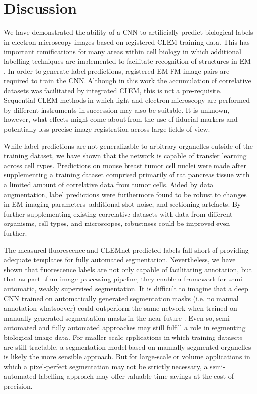 \section{Discussion}
\label{sec:4.3_discussion}

We have demonstrated the ability of a CNN to artificially predict biological labels in electron microscopy images based on registered CLEM training data. This has important ramifications for many areas within cell biology in which additional labelling techniques are implemented to facilitate recognition of structures in EM \cite{de2015correlated}. In order to generate label predictions, registered EM-FM image pairs are required to train the CNN. Although in this work the accumulation of correlative datasets was facilitated by integrated CLEM, this is not a pre-requisite. Sequential CLEM methods in which light and electron microscopy are performed by different instruments in succession may also be suitable. It is unknown, however, what effects might come about from the use of fiducial markers and potentially less precise image registration across large fields of view.

While label predictions are not generalizable to arbitrary organelles outside of the training dataset, we have shown that the network is capable of transfer learning across cell types. Predictions on mouse breast tumor cell nuclei were made after supplementing a training dataset comprised primarily of rat pancreas tissue with a limited amount of correlative data from tumor cells. Aided by data augmentation, label predictions were furthermore found to be robust to changes in EM imaging parameters, additional shot noise, and sectioning artefacts. By further supplementing existing correlative datasets with data from different organisms, cell types, and microscopes, robustness could be improved even further.

The measured fluorescence and CLEMnet predicted labels fall short of providing adequate templates for fully automated segmentation. Nevertheless, we have shown that fluorescence labels are not only capable of facilitating annotation, but that as part of an image processing pipeline, they enable a framework for semi-automatic, weakly supervised segmentation. It is difficult to imagine that a deep CNN trained on automatically generated segmentation masks (i.e. no manual annotation whatsoever) could outperform the same network when trained on manually generated segmentation masks in the near future \cite{dorkenwald2017automated, januszewski2018high, roels2019domain}. Even so, semi-automated and fully automated approaches may still fulfill a role in segmenting biological image data. For smaller-scale applications in which training datasets are still tractable, a segmentation model based on manually segmented organelles is likely the more sensible approach. But for large-scale or volume applications in which a pixel-perfect segmentation may not be strictly necessary, a semi-automated labelling approach may offer valuable time-savings at the cost of precision.

